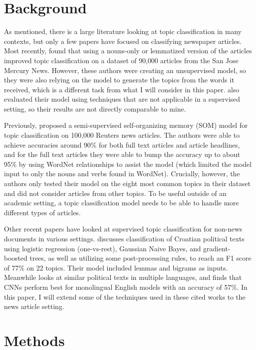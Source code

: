 \documentclass[11pt,a4paper,table]{article}
\begin{document}
\section{Background}
\label{sec:back}

As mentioned, there is a large literature looking at topic classification in many contexts, but only a few papers have focused on classifying newspaper articles. Most recently, \citet{Martin:15} found that using a nouns-only or lemmatized version of the articles improved topic classification on a dataset of 90,000 articles from the San Jose Mercury News. However, these authors were creating an unsupervised model, so they were also relying on the model to generate the topics from the words it received, which is a different task from what I will consider in this paper. \citeauthor{Martin:15} also evaluated their model using techniques that are not applicable in a supervised setting, so their results are not directly comparable to mine.

Previously, \citet{Wermter:02} proposed a semi-supervised self-organizing memory (SOM) model for topic classification on 100,000 Reuters news articles. The authors were able to achieve accuracies around 90\% for both full text articles and article headlines, and for the full text articles they were able to bump the accuracy up to about 95\% by using WordNet relationships to assist the model (which limited the model input to only the nouns and verbs found in WordNet). Crucially, however, the authors only tested their model on the eight most common topics in their dataset and did not consider articles from other topics. To be useful outside of an academic setting, a topic classification model needs to be able to handle more different types of articles.

Other recent papers have looked at supervised topic classification for non-news documents in various settings. \citet{Karan:16} discusses classification of Croatian political texts using logistic regression (one-vs-rest), Gaussian Naive Bayes, and gradient-boosted trees, as well as utilizing some post-processing rules, to reach an F1 score of 77\% on 22 topics. Their model included lemmas and bigrams as inputs. Meanwhile \citet{Glavas:17} looks at similar political texts in multiple languages, and finds that CNNs perform best for monolingual English models with an accuracy of 57\%. In this paper, I will extend some of the techniques used in these cited works to the news article setting.

\section{Methods}
\label{sec:methods}
\end{document}
